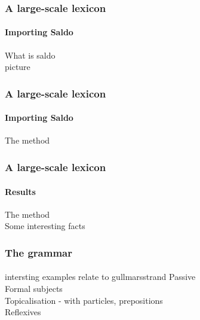 \documentclass[10pt]{beamer}
\renewcommand{\baselinestretch}{1.5}
\begin{document}
\begin{frame}
\frametitle{A large-scale lexicon}
\framesubtitle{Importing Saldo} 
What is saldo \\
picture\\
\end{frame}

\begin{frame}
\frametitle{A large-scale lexicon}
\framesubtitle{Importing Saldo} 
The method\\
\end{frame}

\begin{frame}
\frametitle{A large-scale lexicon}
\framesubtitle{Results} 
The method\\
Some interesting facts \\
\end{frame}

\begin{frame}
\frametitle{The grammar}
\framesubtitle{} 
intersting examples
relate to gullmarsstrand
Passive\\
Formal subjects\\
Topicalisation - with particles, prepositions\\
Reflexives
\end{frame}

\end{document}
